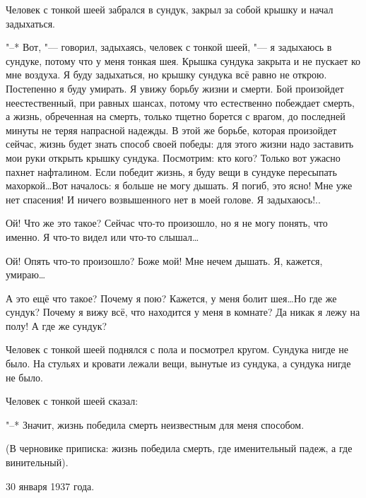 Человек с тонкой шеей забрался в сундук, закрыл за собой крышку и начал задыхаться.
 
"--* Вот, "--- говорил, задыхаясь, человек с тонкой шеей, "--- я задыхаюсь в сундуке, потому что у меня тонкая шея. Крышка сундука закрыта и не пускает ко мне воздуха. Я буду задыхаться, но крышку сундука всё равно не открою. Постепенно я буду умирать. Я увижу борьбу жизни и смерти. Бой произойдет неестественный, при равных шансах, потому что естественно побеждает смерть, а жизнь, обреченная на смерть, только тщетно борется с врагом, до последней минуты не теряя напрасной надежды. В этой же борьбе, которая произойдет сейчас, жизнь будет знать способ своей победы: для этого жизни надо заставить мои руки открыть крышку сундука. Посмотрим: кто кого? Только вот ужасно пахнет нафталином. Если победит жизнь, я буду вещи в сундуке пересыпать махоркой\dots\space Вот началось: я больше не могу дышать. Я погиб, это ясно! Мне уже нет спасения! И ничего возвышенного нет в моей голове. Я задыхаюсь!..
 
Ой! Что же это такое? Сейчас что-то произошло, но я не могу понять, что именно. Я что-то видел или что-то слышал\dots
 
Ой! Опять что-то произошло? Боже мой! Мне нечем дышать. Я, кажется, умираю\dots
 
А это ещё что такое? Почему я пою? Кажется, у меня болит шея\dots\space Но где же сундук? Почему я вижу всё, что находится у меня в комнате? Да никак я лежу на полу! А где же сундук?
 
Человек с тонкой шеей поднялся с пола и посмотрел кругом. Сундука нигде не было. На стульях и кровати лежали вещи, вынутые из сундука, а сундука нигде не было.
 
Человек с тонкой шеей сказал:
 
"--* Значит, жизнь победила смерть неизвестным для меня способом.
 
(В черновике приписка: жизнь победила смерть, где именительный падеж, а где винительный).

\begin{flushright}
30 января 1937 года.
\end{flushright}